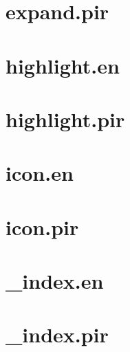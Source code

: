 \let\mypdfximage\pdfximage\def\pdfximage{\immediate\mypdfximage}\documentclass[twoside]{book}
\newcommand{\+}{\discretionary{\mbox{\scriptsize$\hookleftarrow$}}{}{}}
\begin{document}
\chapter{expand.\+pir}
\label{md_themes_relearn_exampleSite_content_shortcodes_expand_pir}

\chapter{highlight.\+en}
\label{md_themes_relearn_exampleSite_content_shortcodes_highlight_en}

\chapter{highlight.\+pir}
\label{md_themes_relearn_exampleSite_content_shortcodes_highlight_pir}

\chapter{icon.\+en}
\label{md_themes_relearn_exampleSite_content_shortcodes_icon_en}

\chapter{icon.\+pir}
\label{md_themes_relearn_exampleSite_content_shortcodes_icon_pir}

\chapter{\+\_\+index.\+en}
\label{md_themes_relearn_exampleSite_content_shortcodes_include__index_en}

\chapter{\+\_\+index.\+pir}
\label{md_themes_relearn_exampleSite_content_shortcodes_include__index_pir}

\end{document}
